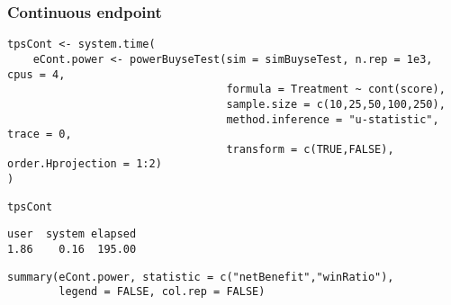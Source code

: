 \documentclass[12pt]{article}
\begin{document}
\clearpage

\subsubsection{Continuous endpoint}
\label{sec:orgb65faa7}
\lstset{language=r,label= ,caption= ,captionpos=b,numbers=none}
\begin{lstlisting}
tpsCont <- system.time(
	eCont.power <- powerBuyseTest(sim = simBuyseTest, n.rep = 1e3, cpus = 4,
								  formula = Treatment ~ cont(score), 
								  sample.size = c(10,25,50,100,250), 
								  method.inference = "u-statistic", trace = 0,
								  transform = c(TRUE,FALSE), order.Hprojection = 1:2)
)
\end{lstlisting}

\lstset{language=r,label= ,caption= ,captionpos=b,numbers=none}
\begin{lstlisting}
tpsCont
\end{lstlisting}

\begin{verbatim}
user  system elapsed 
1.86    0.16  195.00
\end{verbatim}

\lstset{language=r,label= ,caption= ,captionpos=b,numbers=none}
\begin{lstlisting}
summary(eCont.power, statistic = c("netBenefit","winRatio"), 
		legend = FALSE, col.rep = FALSE)
\end{lstlisting}
\end{document}
